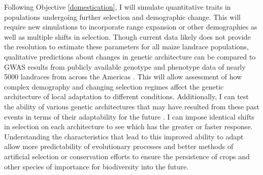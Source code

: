 Following Objective \ref{domestication}, I will simulate quantitative traits in populations undergoing further selection and demographic change. This will require new simulations to incorporate range expansion or other demographies as well as multiple shifts in selection. Though current data likely does not provide the resolution to estimate these parameters for all maize landrace populations, qualitative predictions about changes in genetic architecture can be compared to GWAS results from publicly available genotype and phenotype data of nearly 5000 landraces from across the Americas \citep{Hearne2015}. This will allow assessment of how complex demography and changing selection regimes affect the genetic architecture of local adaptation to different conditions. Additionally, I can test the ability of various genetic architectures that may have resulted from these past events in terms of their adaptability for the future \citep{Yeaman:2015cc}. I can impose identical shifts in selection on each architecture to see which has the greater or faster response. Understanding the characteristics that lead to this improved ability to adapt allow more predictability of evolutionary processes and better methods of artificial selection or conservation efforts to ensure the persistence of crops and other species of importance for biodiversity into the future. 
\vspace{-1ex}



